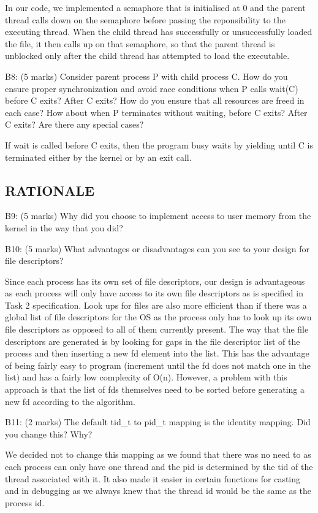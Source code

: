 
In our code, we implemented a semaphore that is initialised at 0 and the parent thread calls down on the semaphore before passing the reponsibility to the executing thread. When the child thread has successfully or unsuccessfully loaded the file, it then calls up on that semaphore, so that the parent thread is unblocked only after the child thread has attempted to load the executable.

\noindent B8: (5 marks)
Consider parent process P with child process C.  How do you
ensure proper synchronization and avoid race conditions when P
calls wait(C) before C exits?  After C exits?  How do you ensure
that all resources are freed in each case?  How about when P
terminates without waiting, before C exits?  After C exits?  Are
there any special cases?

If wait is called before C exits, then the program busy waits by yielding until C is terminated either by the kernel or by an exit call.



\subsection*{RATIONALE}

\noindent B9: (5 marks)
Why did you choose to implement access to user memory from the
kernel in the way that you did?


\noindent B10: (5 marks)
What advantages or disadvantages can you see to your design
for file descriptors?

Since each process has its own set of file descriptors, our design is advantageous as each process will only have access to its own file descriptors as is specified in Task 2 specification. Look ups for files are also more efficient than if there was a global list of file descriptors for the OS as the process only has to look up its own file descriptors as opposed to all of them currently present. The way that the file descriptors are generated is by looking for gaps in the file descriptor list of the process and then inserting a new fd element into the list. This has the advantage of being fairly easy to program (increment until the fd does not match one in the list) and has a fairly low complexity of O(n). However, a problem with this approach is that the list of fds themselves need to be sorted before generating a new fd according to the algorithm.

\noindent B11: (2 marks)
The default tid\_t to pid\_t mapping is the identity mapping.
Did you change this? Why?

We decided not to change this mapping as we found that there was no need to as each process can only have one thread and the pid is determined by the tid of the thread associated with it. It also made it easier in certain functions for casting and in debugging as we always knew that the thread id would be the same as the process id.
